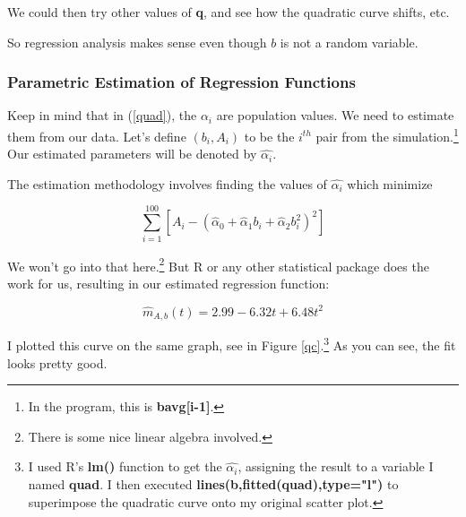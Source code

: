 We could then try other values of {\bf q}, and see how the quadratic curve
shifts, etc.  

So regression analysis makes sense even though $b$ is not a random variable.

\subsubsection{Parametric Estimation of Regression Functions}

Keep in mind that in (\ref{quad}), the $\alpha_i$ are population values.
We need to estimate them from our data.  Let's define $(b_i,A_i)$ to be
the $i^{th}$ pair from the simulation.\footnote{In the program, this is
{\bf bavg[i-1]}.}  Our estimated parameters will be denoted by
$\hat{\alpha_i}$.

The estimation methodology involves finding the values of $\hat{\alpha_i}$
which minimize

\begin{equation}
\sum_{i=1}^{100} [A_i - (\hat{\alpha}_0 + \hat{\alpha}_1 b_i + \hat{\alpha}_2 
b_i^2)^2] 
\end{equation}

We won't go into that here.\footnote{There is some nice linear algebra
involved.}  But R or any other statistical package does the work for us,
resulting in our estimated regression function:

\begin{equation}
\label{quadest}
\hat{m}_{A,b}(t) = 2.99 - 6.32 t + 6.48 t^2
\end{equation}

I plotted this curve on the same graph, see in Figure
\ref{qc}.\footnote{I used R's {\bf lm()} function to get the
$\hat{\alpha_i}$, assigning the result to a variable I named {\bf quad}.
I then executed {\bf lines(b,fitted(quad),type="l")} to superimpose the
quadratic curve onto my original scatter plot.}  As you can see, the
fit looks pretty good.

